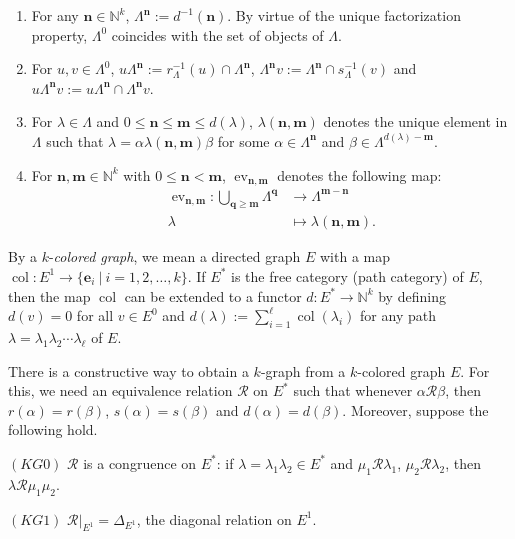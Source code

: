 \documentclass[a4paper,reqno,12pt]{amsart}
\newcommand{\N}{\mathbf{n}}
\newcommand{\M}{\mathbf{m}}
\newcommand{\col}{\operatorname{col}}
\theoremstyle{definition}
\theoremstyle{remark}
\newcommand{\ev}{\operatorname{ev}}
\begin{document}
\begin{enumerate}
\item[$\bullet$] For any $\N\in \mathbb{N}^k$, $\Lambda^\N:=d^{-1}(\N)$. By virtue of the unique factorization property, $\Lambda^0$ coincides with the set of objects of $\Lambda$. 

\item[$\bullet$] For $u,v\in \Lambda^0$, $u\Lambda^\mathbf{n}:=r_\Lambda^{-1}(u)\cap \Lambda^\mathbf{n}$, $\Lambda^\mathbf{n} v:=\Lambda^\mathbf{n}\cap s_\Lambda^{-1}(v)$ and $u\Lambda^\mathbf{n} v:=u\Lambda^\mathbf{n} \cap \Lambda^\mathbf{n} v$. 

\item[$\bullet$] For $\lambda\in \Lambda$ and $0\le \N\le \M\le d(\lambda)$, $\lambda(\N,\M)$ denotes the unique element in $\Lambda$ such that $\lambda=\alpha \lambda(\N,\M)\beta$ for some $\alpha\in \Lambda^\N$ and $\beta\in \Lambda^{d(\lambda)-\M}$. 

\item[$\bullet$] For $\N,\M\in \mathbb{N}^k$ with $0\le\N<\M$, $\ev_{\N,\M}$ denotes the following map:
\begin{align*}
\ev_{\N,\M}:\displaystyle{\bigcup_{\mathbf{q}\ge \M}}\Lambda^\mathbf{q}&\longrightarrow \Lambda^{\M-\N}\\
\lambda&\longmapsto \lambda(\N,\M).
\end{align*} 
\end{enumerate}

By a $k$-\emph{colored graph}, we mean a directed graph $E$ with a map $\col:E^1\longrightarrow \{\mathbf{e}_i~|~i=1,2,\ldots,k\}$. If $E^*$ is the free category (path category) of $E$, then the map $\col$ can be extended to a functor $d:E^*\longrightarrow \mathbb{N}^k$ by defining $d(v)=0$ for all $v\in E^0$ and $d(\lambda):=\displaystyle{\sum_{i=1}^{\ell}} \col(\lambda_i)$ for any path $\lambda=\lambda_1 \lambda_2\cdots \lambda_\ell$ of $E$. 

There is a constructive way to obtain a $k$-graph from a $k$-colored graph $E$. For this, we need an equivalence relation $\mathcal{R}$ on $E^*$ such that whenever $\alpha\mathcal{R}\beta$, then $r(\alpha)=r(\beta)$, $s(\alpha)=s(\beta)$ and $d(\alpha)=d(\beta)$. Moreover, suppose the following hold.

$(KG0)$ $\mathcal{R}$ is a congruence on $E^*$: if $\lambda=\lambda_1\lambda_2\in E^*$ and $\mu_1\mathcal{R}\lambda_1$, $\mu_2\mathcal{R}\lambda_2$, then $\lambda\mathcal{R}\mu_1\mu_2$. 

$(KG1)$ $\mathcal{R}|_{E^1}=\Delta_{E^1}$, the diagonal relation on $E^1$.
\end{document}
